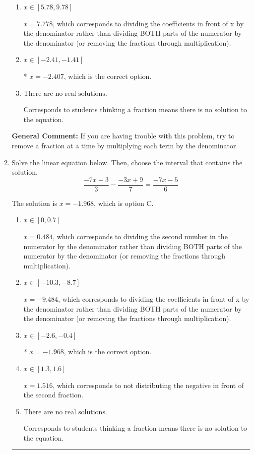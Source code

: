 \documentclass{extbook}[14pt]
\newcommand{\litem}[1]{\item #1

\rule{\textwidth}{0.4pt}}
\begin{document}
\begin{enumerate}
{\begin{enumerate}[label=\Alph*.]
 $x = -6.407$, which corresponds to not distributing the negative in front of the second fraction.
\item \( x \in [5.78, 9.78] \)

 $x = 7.778$, which corresponds to dividing the coefficients in front of x by the denominator rather than dividing BOTH parts of the numerator by the denominator (or removing the fractions through multiplication).
\item \( x \in [-2.41, -1.41] \)

* $x = -2.407$, which is the correct option.
\item \( \text{There are no real solutions.} \)

Corresponds to students thinking a fraction means there is no solution to the equation.
\end{enumerate}

\textbf{General Comment:} If you are having trouble with this problem, try to remove a fraction at a time by multiplying each term by the denominator.
}
\litem{
Solve the linear equation below. Then, choose the interval that contains the solution.
\[ \frac{-7x -3}{3} - \frac{-3x + 9}{7} = \frac{-7x -5}{6} \]

The solution is \( x = -1.968 \), which is option C.\begin{enumerate}[label=\Alph*.]
\item \( x \in [0, 0.7] \)

 $x = 0.484$, which corresponds to dividing the second number in the numerator by the denominator rather than dividing BOTH parts of the numerator by the denominator (or removing the fractions through multiplication).
\item \( x \in [-10.3, -8.7] \)

 $x = -9.484$, which corresponds to dividing the coefficients in front of x by the denominator rather than dividing BOTH parts of the numerator by the denominator (or removing the fractions through multiplication).
\item \( x \in [-2.6, -0.4] \)

* $x = -1.968$, which is the correct option.
\item \( x \in [1.3, 1.6] \)

 $x = 1.516$, which corresponds to not distributing the negative in front of the second fraction.
\item \( \text{There are no real solutions.} \)

Corresponds to students thinking a fraction means there is no solution to the equation.
\end{enumerate}

}
\end{enumerate}
\end{document}
